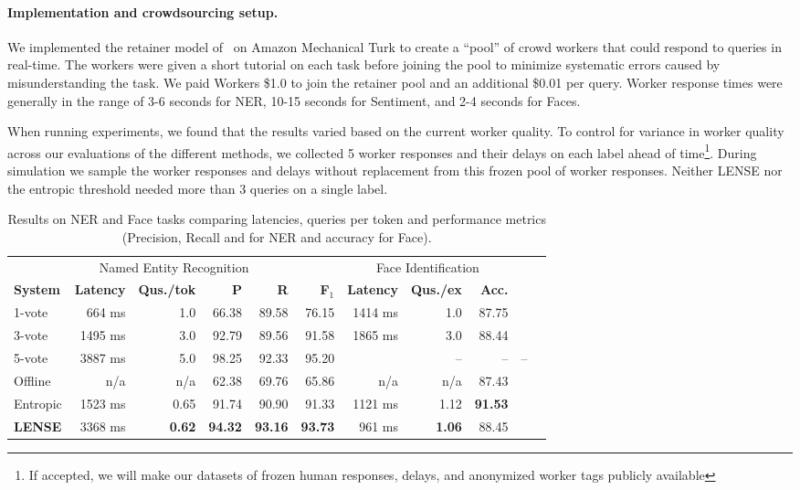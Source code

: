 \paragraph{Implementation and crowdsourcing setup.}
We implemented the retainer model of~\cite{bernstein2011crowds} on Amazon Mechanical Turk to create a ``pool'' of crowd workers that could respond to queries in real-time.
The workers were given a short tutorial on each task before joining the pool to minimize systematic errors caused by misunderstanding the task.
We paid Workers \$1.0 to join the retainer pool and an additional \$0.01 per query.
Worker response times were generally in the range of 3-6 seconds for NER, 10-15 seconds for Sentiment, and 2-4 seconds for Faces.

When running experiments, we found that the results varied based on the current worker quality. %
To control for variance in worker quality across our evaluations of the different methods, we collected 5 worker responses and their delays on each label ahead of time\footnote{If accepted, we will make our datasets of frozen human responses, delays, and anonymized worker tags publicly available}.
During simulation we sample the worker responses and delays without replacement from this frozen pool of worker responses. 
Neither LENSE nor the entropic threshold needed more than 3 queries on a single label.

\begin{table}[t]
\begin{tabular}{l r r r r r | r r r r r}
  \multicolumn{6}{c|}{Named Entity Recognition} & 
      \multicolumn{3}{c}{Face Identification} \\
      \textbf{System} & \textbf{Latency} & \textbf{Qus./tok} & \textbf{P} & \textbf{R} & \textbf{F$_1$} 
          & \textbf{Latency} & \textbf{Qus./ex} & \textbf{Acc.} 
    \\ \hline
    1-vote & 664 ms & 1.0 & 66.38 & 89.58 & 76.15 
      & %
      1414 ms & 1.0 & 87.75 \\ %
    3-vote & 1495 ms & 3.0 & 92.79 & 89.56 & 91.58 
        & %
        1865 ms & 3.0 & 88.44 \\ %
    5-vote & 3887 ms & 5.0 & 98.25 & 92.33 & 95.20 
        & 
        & -- & -- & -- \\
    Offline & n/a & n/a & 62.38 & 69.76 & 65.86 
        & n/a & n/a & 87.43 \\    %
    Entropic & 1523 ms & 0.65 & 91.74 & 90.90 & 91.33 
        & 1121 ms & 1.12 & \textbf{91.53} \\ %
    \textbf{LENSE} & 3368 ms & \textbf{0.62} & \textbf{94.32} & \textbf{93.16} & \textbf{93.73} 
    & 961 ms & \textbf{1.06} & 88.45 \\   %
\end{tabular}
\caption{Results on NER and Face tasks comparing latencies, queries per token and performance metrics (Precision, Recall and \fone{} for NER and accuracy for Face).}
\label{tbl:results}
\end{table}

